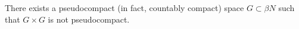 There exists a pseudocompact (in fact, countably compact) space $G \subset \beta N$ such that $G \times G$ is not pseudocompact.
